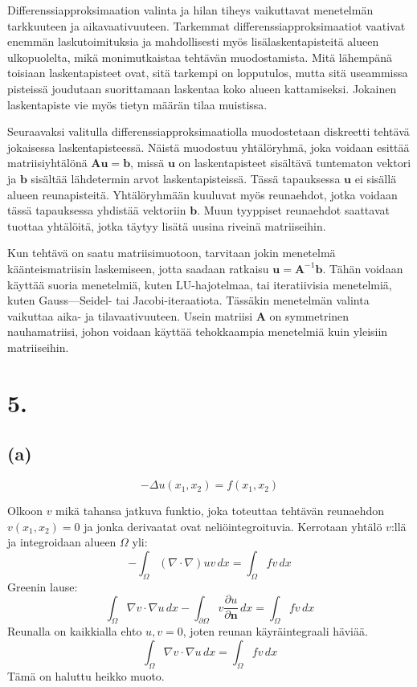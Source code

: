 \documentclass{article}
\begin{document}
Differenssiapproksimaation valinta ja hilan tiheys vaikuttavat
menetelmän tarkkuuteen ja aikavaativuuteen. Tarkemmat
differenssiapproksimaatiot vaativat enemmän laskutoimituksia ja mahdolli\-sesti
myös lisälaskentapisteitä alueen ulkopuolelta, mikä monimutkaistaa tehtävän
muodostamista. Mitä lähempänä toisiaan laskentapisteet ovat, sitä tarkempi on
lopputulos, mutta sitä useammissa pisteissä joudutaan suorittamaan laskentaa
koko alueen kattamiseksi.  Jokainen laskentapiste vie myös tietyn määrän tilaa
muistissa.

Seuraavaksi valitulla differenssiapproksimaatiolla muodostetaan diskreetti
tehtävä jokaisessa las\-kentapisteessä. Näistä muodostuu yhtälöryhmä, joka
voidaan esittää matriisiyhtälönä $\mathbf{A}\mathbf{u} = \mathbf{b}$, missä
$\mathbf{u}$ on laskentapisteet sisältävä tuntematon vektori ja $\mathbf{b}$
sisältää lähdetermin arvot laskentapisteissä. Tässä tapauksessa $\mathbf{u}$ ei
sisällä alueen reunapisteitä. Yhtälöryhmään kuuluvat myös reuna\-ehdot, jotka
voidaan tässä tapauksessa yhdistää vektoriin $\mathbf{b}$. Muun tyyppiset
reunaehdot saattavat tuottaa yhtälöitä, jotka täytyy lisätä uusina riveinä
matriiseihin.

Kun tehtävä on saatu matriisimuotoon, tarvitaan jokin menetelmä käänteismatriisin
laskemiseen, jotta saadaan ratkaisu $\mathbf{u} = \mathbf{A}^{-1}\mathbf{b}$.
Tähän voidaan käyttää suoria menetelmiä, kuten LU-hajotelmaa, tai iteratiivisia
menetelmiä, kuten Gauss—Seidel- tai Jacobi-iteraatiota. Tässäkin menetelmän
va\-linta vaikuttaa aika- ja tilavaativuuteen. Usein matriisi $\mathbf{A}$ on
symmetrinen nauhamatriisi, johon voidaan käyttää tehokkaampia menetelmiä
kuin yleisiin matriiseihin.

\newpage
\section*{5.}

\subsection*{(a)}

\[
  -\Delta u(x_1,x_2) = f(x_1,x_2)
\]

Olkoon $v$ mikä tahansa jatkuva funktio, joka toteuttaa tehtävän reunaehdon
$v(x_1,x_2) = 0$ ja jonka derivaatat ovat neliöintegroituvia. Kerrotaan yhtälö
$v$:llä ja integroidaan alueen $\Omega$ yli:
\[
  -\int_{\Omega} (\nabla \cdot \nabla)uv\,dx = \int_{\Omega} fv\,dx
\]
Greenin lause:
\[
  \int_{\Omega} \nabla v \cdot \nabla u\,dx
  - \int_{\partial \Omega} v\frac{\partial u}{\partial \mathbf{n}}\,dx
  = \int_{\Omega} fv\,dx
\]
Reunalla on kaikkialla ehto $u,v=0$, joten reunan käyräintegraali häviää.
\[
  \int_{\Omega} \nabla v \cdot \nabla u\,dx = \int_{\Omega} fv\,dx
\]
Tämä on haluttu heikko muoto.
\end{document}
